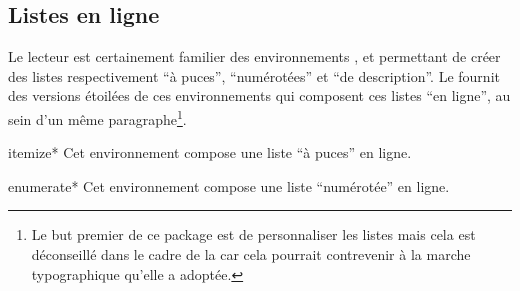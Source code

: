 

\subsection{Listes en ligne}
\label{sec:listes-en-ligne}

Le lecteur est certainement familier des environnements
,  et
 permettant de créer des listes respectivement
\enquote{à puces}, \enquote{numérotées} et \enquote{de description}. Le
 fournit des versions étoilées de ces environnements qui
composent ces listes \enquote{en ligne}, \cad*{} au sein d'un même
paragraphe\footnote{Le but premier de ce package est de personnaliser les listes
  mais cela est déconseillé dans le cadre de la \gzt{} car cela pourrait
  contrevenir à la marche typographique qu'elle a adoptée.}.

\begin{docEnvironment}[doclang/environment content=liste]{itemize*}{}
  Cet environnement compose une liste \enquote{à puces} en ligne.
\end{docEnvironment}

\begin{docEnvironment}[doclang/environment content=liste]{enumerate*}{}
  Cet environnement compose une liste \enquote{numérotée} en ligne.
\end{docEnvironment}


